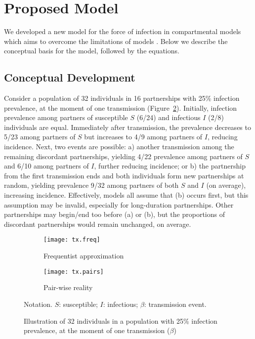 \section{Proposed Model}\label{prop}
We developed a new model for the force of infection in compartmental models
which aims to overcome the limitations of models .
Below we describe the conceptual basis for the model, followed by the equations.
\subsection{Conceptual Development}\label{prop.cd}
Consider a population of 32 individuals in 16 partnerships with 25\% infection prevalence,
at the moment of one transmission (Figure~\ref{fig:tx.pairs}).
Initially, infection prevalence among partners
of susceptible $S$ (6/24) and infectious $I$ (2/8) individuals are equal.
Immediately after transmission, the prevalence
decreases to 5/23 among partners of $S$ but increases to 4/9 among partners of $I$, reducing incidence.
Next, two events are possible:
a) another transmission among the remaining discordant partnerships,
yielding 4/22 prevalence among partners of $S$ and 6/10 among partners of $I$,
further reducing incidence; or
b) the partnership from the first transmission ends
and both individuals form new partnerships at random,
yielding prevalence 9/32 among partners of both $S$ and $I$ (on average), increasing incidence.
Effectively, models  all assume that (b) occurs first,
but this assumption may be invalid, especially for long-duration partnerships.
Other partnerships may begin/end too before (a) or (b),
but the proportions of discordant partnerships would remain unchanged, on average.
\begin{figure}[h]
  \begin{subfigure}{\textwidth}
    \centerline{\texttt{[image: tx.freq]}}
    \caption{Frequentist approximation}
    \label{fig:tx.freq}
  \end{subfigure}
  \begin{subfigure}{\textwidth}
    \centerline{\texttt{[image: tx.pairs]}}
    \caption{Pair-wise reality}
    \label{fig:tx.pairs}
  \end{subfigure}
  \caption{Illustration of 32 individuals in a population with 25\% infection prevalence,
    at the moment of one transmission ($\beta$)}
  \label{fig:tx}
  \floatfoot
  Notation. $S$: susceptible; $I$: infectious; $\beta$: transmission event.
\end{figure}
